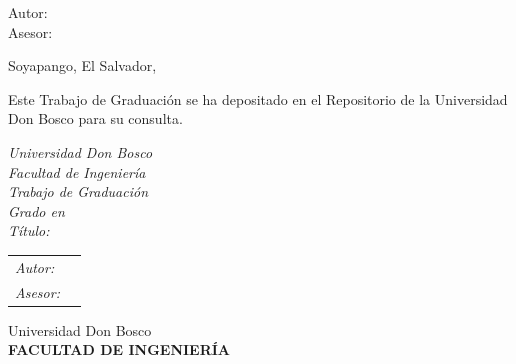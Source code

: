 \begin{titlepage}
    \begin{center}
        \Large\bfseries {  \TituloTFG{} }
    \end{center}
    
    \vspace*{1cm}
    
    \noindent
    \large{Autor: \NombreAutor{} }\\
    \large{Asesor: \NombreTutor{} }
        
    \vspace*{2cm}
    
    \begin{center}
        Soyapango, El Salvador, \Fecha
    \end{center}
    
    \newpage
    \thispagestyle{empty}
    
    \noindent
    Este Trabajo de Graduación se ha depositado en el Repositorio de la Universidad Don Bosco para su consulta.
    
    \vspace*{3cm}

    \textit{Universidad Don Bosco} \\    
    \textit{Facultad de Ingeniería} \\
    \textit{Trabajo de Graduación} \\
    \textit{Grado en} \Grado{} \\

    \textit{Título:} \TituloTFG{} \\
    \Fecha
    
    \vspace*{3cm}
    \noindent
    \begin{tabular}{ll}
        \textit{Autor:} & \NombreAutor{}  \\
        \textit{Asesor:} & \NombreTutor{}  
    \end{tabular}
    
    
    \newpage
    \thispagestyle{empty}
    \noindent
    
    \begin{center}
        \huge{ Universidad Don Bosco }\\
        \vspace*{0.5cm}
        \Large{\textbf{ FACULTAD DE INGENIERÍA }}
    \end{center}


\end{titlepage}
